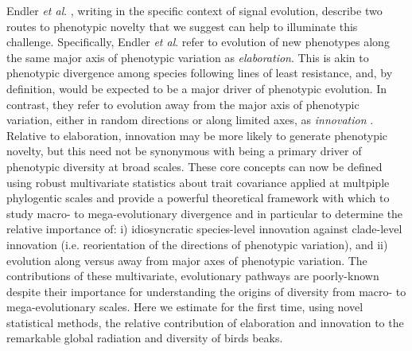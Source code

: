 \documentclass[12pt,letterpaper]{article}
\begin{document}
Endler \textit{et al}. \cite{endler2005animal}, writing in the specific context of signal evolution, describe two routes to phenotypic novelty that we suggest can help to illuminate this challenge.
Specifically, Endler \textit{et al}. refer to evolution of new phenotypes along the same major axis of phenotypic variation as \textit{elaboration}.
This is akin to phenotypic divergence among species following lines of least resistance, and, by definition, would be expected to be a major driver of phenotypic evolution.
In contrast, they refer to evolution away from the major axis of phenotypic variation, either in random directions or along limited axes, as \textit{innovation} \cite{endler2005animal}.
Relative to elaboration, innovation may be more likely to generate phenotypic novelty, but this need not be synonymous with being a primary driver of phenotypic diversity at broad scales.
These core concepts can now be defined using robust multivariate statistics about trait covariance applied at multpiple phylogentic scales and provide a powerful theoretical framework with which to study macro- to mega-evolutionary divergence and in particular to determine the relative importance of:
i) idiosyncratic species-level innovation against clade-level innovation (i.e. reorientation of the directions of phenotypic variation),
and ii) evolution along versus away from major axes of phenotypic variation.
The contributions of these multivariate, evolutionary pathways are poorly-known despite their importance for understanding the origins of diversity from macro- to mega-evolutionary scales. 
Here we estimate for the first time, using novel statistical methods, the relative contribution of elaboration and innovation to the remarkable global radiation and diversity of birds beaks.
 
\end{document}
